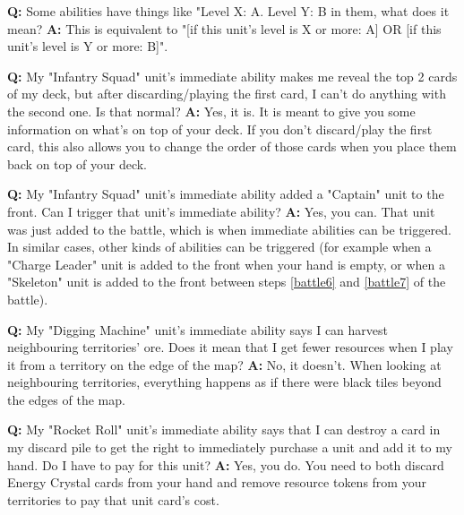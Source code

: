 \documentclass[a4paper]{article}
\begin{document}
    \hspace{-2em}
    \textbf{Q:} Some abilities have things like "Level X: A. Level Y: B in them,
     what does it mean?
    \newline
    \textbf{A:} This is equivalent to "[if this unit's level is X or more: A]
     OR [if this unit's level is Y or more: B]".

    \hspace{-2em}
    \textbf{Q:} My "Infantry Squad" unit's immediate ability makes me reveal
    the top 2 cards of my deck, but after discarding/playing the first card,
    I can't do anything with the second one. Is that normal?
    \newline
    \textbf{A:} Yes, it is. It is meant to give you some information on what's
    on top of your deck. If you don't discard/play the first card,
    this also allows you to change the order of those cards when you place them back
    on top of your deck.

    \hspace{-2em}
    \textbf{Q:} My "Infantry Squad" unit's immediate ability added
    a "Captain" unit to the front. Can I trigger that unit's immediate ability?
    \newline
    \textbf{A:} Yes, you can. That unit was just added to the battle,
    which is when immediate abilities can be triggered.
    In similar cases, other kinds of abilities can be triggered
    (for example when a "Charge Leader" unit is added to the front when your
    hand is empty, or when a "Skeleton" unit is added to the front
    between steps \ref{battle6} and \ref{battle7} of the battle).

    \hspace{-2em}
    \textbf{Q:} My "Digging Machine" unit's immediate ability says I can harvest
    neighbouring territories' ore. Does it mean that I get fewer resources when
    I play it from a territory on the edge of the map?
    \newline
    \textbf{A:} No, it doesn't. When looking at neighbouring territories,
    everything happens as if there were black tiles beyond the edges of the map.

    \hspace{-2em}
    \textbf{Q:} My "Rocket Roll" unit's immediate ability says that I can destroy a card
    in my discard pile to get the right to immediately purchase a unit
    and add it to my hand. Do I have to pay for this unit?
    \newline
    \textbf{A:} Yes, you do.
    You need to both discard Energy Crystal cards from your hand
    and remove resource tokens from your territories to pay that unit card's cost.
    
\end{document}
